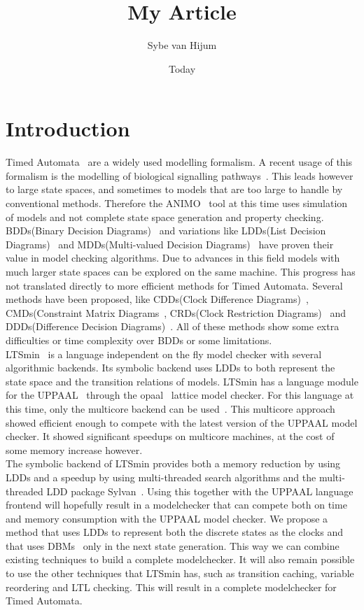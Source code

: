 \documentclass[11pt]{article}
\begin{document}
\newtheorem{mydef}{Definition}
\title{My Article}
\author{Sybe van Hijum}
\date{Today}
\maketitle

\section{Introduction}
Timed Automata~\cite{Alur1994183} are a widely used modelling formalism. A recent usage of this formalism is the modelling of biological signalling pathways~\cite{DBLP:conf/bibe/SchivoSWCVKLPP12}. This leads however to large state spaces, and sometimes to models that are too large to handle by conventional methods. Therefore the ANIMO~\cite{DBLP:conf/bibe/SchivoSWCVKLPP12} tool at this time uses simulation of models and not complete state space generation and property checking.
\\BDDs(Binary Decision Diagrams)~\cite{?} and variations like LDDs(List Decision Diagrams)~\cite{so62465} and MDDs(Multi-valued Decision Diagrams)~\cite{129849} have proven their value in model checking algorithms. Due to advances in this field models with much larger state spaces can be explored on the same machine. This progress has not translated directly to more efficient methods for Timed Automata. Several methods have been proposed, like CDDs(Clock Difference Diagrams)~\cite{BRICS19491}, CMDs(Constraint Matrix Diagrams~\cite{5702245}, CRDs(Clock Restriction Diagrams)~\cite{crds} and DDDs(Difference Decision Diagrams)~\cite{Møller200188}. All of these methods show some extra difficulties or time complexity over BDDs or some limitations.
\\LTSmin~\cite{eemcs18152,ltsmin-mc:nmf2011} is a language independent on the fly model checker with several algorithmic backends. Its symbolic backend uses LDDs to both represent the state space and the transition relations of models. LTSmin has a language module for the UPPAAL~\cite{UPPAAL} through the opaal~\cite{opaal} lattice model checker. For this language at this time, only the multicore backend can be used~\cite{eemcs21972}. This multicore approach showed efficient enough to compete with the latest version of the UPPAAL model checker. It showed significant speedups on multicore machines, at the cost of some memory increase however.
\\The symbolic backend of LTSmin provides both a memory reduction by using LDDs and a speedup by using multi-threaded search algorithms and the multi-threaded LDD package Sylvan~\cite{sylvan}. Using this together with the UPPAAL language frontend will hopefully result in a modelchecker that can compete both on time and memory consumption with the UPPAAL model checker. We propose a method that uses LDDs to represent both the discrete states as the clocks and that uses DBMs~\cite{dbmorig, bengtsson2002clocks} only in the next state generation. This way we can combine existing techniques to build a complete modelchecker. It will also remain possible to use the other techniques that LTSmin has, such as transition caching, variable reordering and LTL checking. This will result in a complete modelchecker for Timed Automata.
\end{document}

